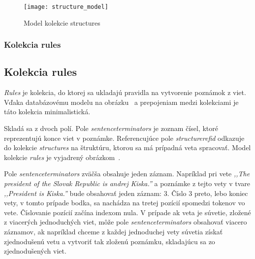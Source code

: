 \begin{figure}[H]
	\begin{center}\texttt{[image: structure\_model]}\end{center}
	\caption[Model kolekcie structures]{Model kolekcie structures}\label{fig:structures_collection_model}
\end{figure}

%
%
{
	\subsubsection{Kolekcia rules}
}
{
	\subsection{Kolekcia rules}
}
\label{subsubsection:collection_rules}
\textit{Rules} je kolekcia, do ktorej sa ukladajú pravidla na vytvorenie poznámok z viet. Vďaka databázovému modelu na obrázku~ a prepojeniam medzi kolekciami je táto kolekcia minimalistická.

Skladá sa z dvoch polí. Pole \textit{sentence\textunderscore terminators} je zoznam čísel, ktoré reprezentujú konce viet v poznámke. Referencujúce pole \textit{structure\textunderscore ref\textunderscore id} odkazuje do kolekcie \textit{structures} na štruktúru, ktorou sa má prípadná veta spracovať. Model kolekcie \textit{rules} je vyjadrený obrázkom~.

Pole \textit{sentence\textunderscore terminators} zväčša obsahuje jeden záznam. Napríklad pri vete \textit{,,The president of the Slovak Republic is andrej Kiska.''} a poznámke z tejto vety v tvare \textit{,,President is Kiska.''} bude obsahovať jeden záznam: 3. Číslo 3 preto, lebo koniec vety, v tomto prípade bodka, sa nachádza na tretej pozícií spomedzi tokenov vo vete. Číslovanie pozícií začína indexom nula. V prípade ak veta je súvetie, zložené z viacerých jednoduchých viet, môže pole \textit{sentence\textunderscore terminators} obsahovať viacero záznamov, ak napríklad chceme z každej jednoduchej vety súvetia získať zjednodušenú vetu a vytvoriť tak zloženú poznámku, skladajúcu sa zo zjednodušených viet.

